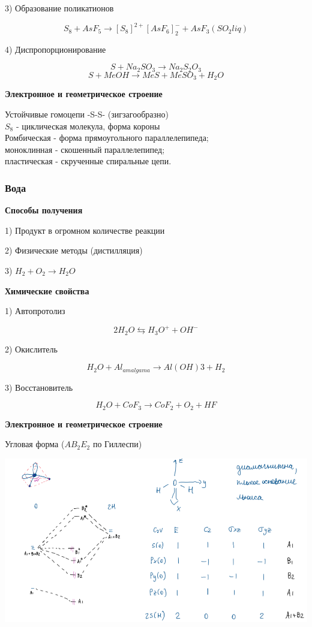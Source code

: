 3) Образование поликатионов

$$S_8 + AsF_5 \rightarrow [S_8]^{2+}[AsF_6]_2^- + AsF_3(SO_2 liq)$$

4) Диспропорционирование

$$S + Na_2SO_3 \rightarrow Na_2S_2O_3$$
$$S + MeOH \rightarrow MeS + MeSO_3 + H_2O$$

\textbf{Электронное и геометрическое строение}

Устойчивые гомоцепи -S-S- (зигзагообразно)\\
$S_8$ - циклическая молекула, форма короны\\
Ромбическая - форма прямоугольного параллелепипеда;\\
моноклинная - скошенный параллелепипед;\\
пластическая - скрученные спиральные цепи.

\subsubsection*{Вода}

\textbf{Способы получения}


1) Продукт в огромном количестве реакции

2) Физические методы (дистилляция)

3) $H_2 + O_2 \rightarrow H_2O$

\textbf{Химические свойства}

1) Автопротолиз

$$2H_2O \leftrightarrows H_3O^+ + OH^-$$

2) Окислитель

$$H_2O + Al_{amalgama}\rightarrow Al(OH)3 + H_2$$

3) Восстановитель

$$H_2O + CoF_3 \rightarrow CoF_2 + O_2 + HF$$

\textbf{Электронное и геометрическое строение}

Угловая форма ($AB_2E_2$  по Гиллеспи)

\includegraphics{images/6v2.png}

